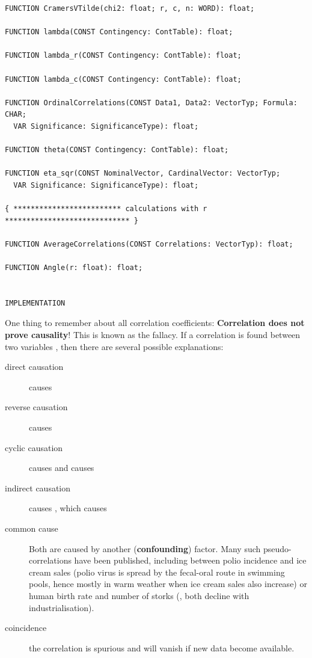 \begin{refsection}
\begin{lstlisting}[caption=Interface for unit Correlations]
FUNCTION CramersVTilde(chi2: float; r, c, n: WORD): float;

FUNCTION lambda(CONST Contingency: ContTable): float;

FUNCTION lambda_r(CONST Contingency: ContTable): float;

FUNCTION lambda_c(CONST Contingency: ContTable): float;

FUNCTION OrdinalCorrelations(CONST Data1, Data2: VectorTyp; Formula: CHAR;
  VAR Significance: SignificanceType): float;

FUNCTION theta(CONST Contingency: ContTable): float;

FUNCTION eta_sqr(CONST NominalVector, CardinalVector: VectorTyp;
  VAR Significance: SignificanceType): float;

{ ************************* calculations with r ***************************** }

FUNCTION AverageCorrelations(CONST Correlations: VectorTyp): float;

FUNCTION Angle(r: float): float;


IMPLEMENTATION
\end{lstlisting}

One thing to remember about all correlation coefficients: \textbf{Correlation does not prove causality}! This is known as the  fallacy. If a correlation is found between two variables , then there are several possible explanations:
\begin{description}
  \item[direct causation]{ causes }
  \item[reverse causation]{ causes }
  \item[cyclic causation]{ causes  and  causes }
  \item[indirect causation]{ causes , which causes }
  \item[common cause]{Both  are caused by another (\textbf{confounding}) factor. Many such pseudo-correlations have been published, including between polio incidence and ice cream sales (polio virus is spread by the fecal-oral route in swimming pools, hence mostly in warm weather when ice cream sales also increase) or human birth rate and number of storks (\parencite{Sie-88}, both decline with industrialisation).}
  \item[coincidence]{the correlation is spurious and will vanish if new data become available.}
\end{description}


\end{refsection}
